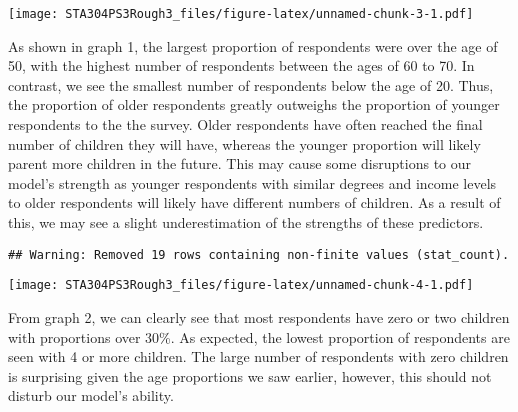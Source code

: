 \documentclass[
]{article}
\newenvironment{Shaded}{\begin{snugshade}}{\end{snugshade}}
\newcommand{\CommentTok}[1]{\textcolor[rgb]{0.56,0.35,0.01}{\textit{#1}}}
\newcommand{\DataTypeTok}[1]{\textcolor[rgb]{0.13,0.29,0.53}{#1}}
\newcommand{\KeywordTok}[1]{\textcolor[rgb]{0.13,0.29,0.53}{\textbf{#1}}}
\newcommand{\NormalTok}[1]{#1}
\newcommand{\OperatorTok}[1]{\textcolor[rgb]{0.81,0.36,0.00}{\textbf{#1}}}
\newcommand{\StringTok}[1]{\textcolor[rgb]{0.31,0.60,0.02}{#1}}
\begin{document}
\texttt{[image: STA304PS3Rough3\_files/figure-latex/unnamed-chunk-3-1.pdf]}

As shown in graph 1, the largest proportion of respondents were over the
age of 50, with the highest number of respondents between the ages of 60
to 70. In contrast, we see the smallest number of respondents below the
age of 20. Thus, the proportion of older respondents greatly outweighs
the proportion of younger respondents to the the survey. Older
respondents have often reached the final number of children they will
have, whereas the younger proportion will likely parent more children in
the future. This may cause some disruptions to our model's strength as
younger respondents with similar degrees and income levels to older
respondents will likely have different numbers of children. As a result
of this, we may see a slight underestimation of the strengths of these
predictors.

\begin{Shaded}
\end{Shaded}

\begin{verbatim}
## Warning: Removed 19 rows containing non-finite values (stat_count).
\end{verbatim}

\texttt{[image: STA304PS3Rough3\_files/figure-latex/unnamed-chunk-4-1.pdf]}

From graph 2, we can clearly see that most respondents have zero or two
children with proportions over 30\%. As expected, the lowest proportion
of respondents are seen with 4 or more children. The large number of
respondents with zero children is surprising given the age proportions
we saw earlier, however, this should not disturb our model's ability.
\end{document}
